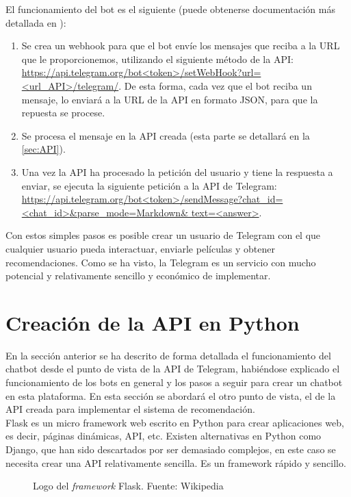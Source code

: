 El funcionamiento del bot es el siguiente (puede obtenerse documentación más detallada en \cite{Telegram}):

\begin{enumerate}
    \item Se crea un webhook para que el bot envíe los mensajes que reciba a la URL que le proporcionemos, utilizando el siguiente método de la API: \url{https://api.telegram.org/bot<token>/setWebHook?url=<url_API>/telegram/}. De esta forma, cada vez que el bot reciba un mensaje, lo enviará a la URL de la API en formato JSON, para que la repuesta se procese.
    \item Se procesa el mensaje en la API creada (esta parte se detallará en la \autoref{sec:API}).
    \item Una vez la API ha procesado la petición del usuario y tiene la respuesta a enviar, se ejecuta la siguiente petición a la API de Telegram: \url{https://api.telegram.org/bot<token>/sendMessage?chat_id=<chat_id>&parse_mode=Markdown& text=<answer>}.
\end{enumerate}

Con estos simples pasos es posible crear un usuario de Telegram con el que cualquier usuario pueda interactuar, enviarle películas y obtener recomendaciones. Como se ha visto, la Telegram es un servicio con mucho potencial y relativamente sencillo y económico de implementar.

\section{Creación de la API en Python} \label{sec:API}

En la sección anterior se ha descrito de forma detallada el funcionamiento del chatbot desde el punto de vista de la API de Telegram, habiéndose explicado el funcionamiento de los bots en general y los pasos a seguir para crear un chatbot en esta plataforma. En esta sección se abordará el otro punto de vista, el de la API creada para implementar el sistema de recomendación.\\

Flask \cite{wiki:FlaskHelloWorld} es un micro framework web escrito en Python para crear aplicaciones web, es decir, páginas dinámicas, API, etc. Existen alternativas en Python como Django, que han sido descartados por ser demasiado complejos, en este caso se necesita crear una API relativamente sencilla. Es un framework rápido y sencillo.

\begin{figure}[H]
    \centering
    \captionsetup{width=7cm}
    
    \caption{Logo del \textit{framework} Flask. Fuente: Wikipedia \cite{wiki:FlaskHelloWorld}}
\end{figure}


